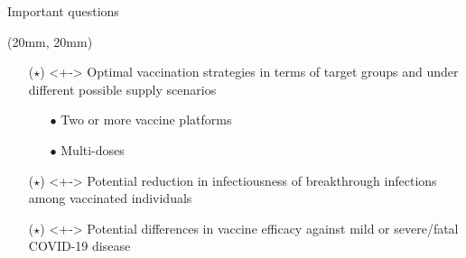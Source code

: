 \begin{frame}{Important questions}
    \begin{textblock*}{90mm}(20mm, 20mm)  
        \begin{itemize}
            \item[($\star$)]<+->
                Optimal vaccination strategies in terms of target groups 
                and under different possible supply scenarios 
                \begin{itemize}
                    \item[$\bullet$]
                        Two or more vaccine platforms
                    \item[$\bullet$]
                        Multi-doses
                \end{itemize}
            \item[($\star$)]<+->
                Potential reduction in infectiousness of 
                breakthrough infections among vaccinated
                individuals
            \item[($\star$)]<+->
                Potential differences in vaccine efficacy against 
                mild or severe/fatal COVID-19 disease
        \end{itemize}
    \end{textblock*}
\end{frame}

